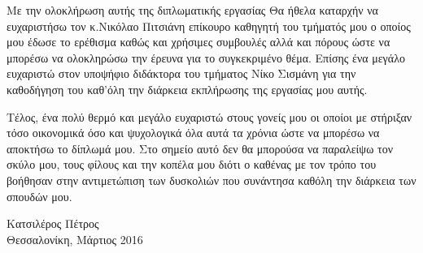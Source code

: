 
\cleardoublepage


\begin{acknowledgements}

\par Με την ολοκλήρωση αυτής της διπλωματικής εργασίας Θα ήθελα καταρχήν να ευχαριστήσω τον κ.Νικόλαο Πιτσιάνη επίκουρο καθηγητή του τμήματός μου ο οποίος μου έδωσε το ερέθισμα καθώς και χρήσιμες συμβουλές αλλά και πόρους ώστε να μπορέσω να ολοκληρώσω την έρευνα για το συγκεκριμένο θέμα. Επίσης ένα μεγάλο ευχαριστώ στον υποψήφιο διδάκτορα του τμήματος Νίκο Σισμάνη για την καθοδήγηση του καθ'όλη την διάρκεια εκπλήρωσης της εργασίας μου αυτής. 

\par Τέλος, ένα πολύ θερμό και μεγάλο ευχαριστώ στους γονείς μου οι οποίοι με στήριξαν τόσο οικονομικά όσο και ψυχολογικά όλα αυτά τα χρόνια ώστε να μπορέσω να αποκτήσω το δίπλωμά μου. Στο σημείο αυτό δεν θα μπορούσα να παραλείψω τον σκύλο μου, τους φίλους και την κοπέλα μου διότι ο καθένας με τον τρόπο του βοήθησαν στην αντιμετώπιση των δυσκολιών που συνάντησα καθόλη την διάρκεια των σπουδών μου.

\begin{flushright}
Κατσιλέρος Πέτρος \\
Θεσσαλονίκη, Μάρτιος 2016
\end{flushright}

\end{acknowledgements}
